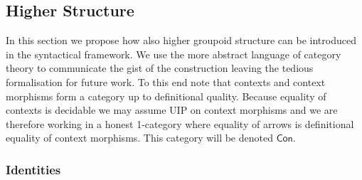 

\subsection{Higher Structure}
%
In this section we propose how also higher groupoid structure can be
introduced in the syntactical framework. We use the more abstract
language of category theory to communicate the gist of the
construction leaving the tedious formalisation for future work. To this
end note that contexts and context morphisms form a category up to
definitional quality. Because equality of contexts is decidable we
may assume \textsf{UIP} on context morphisms and we are therefore
working in a honest 1-category where equality of arrows is
definitional equality of context morphisms. This category will be
denoted $\mathsf{Con}$.

\subsubsection{Identities}
\label{sec:spans}

